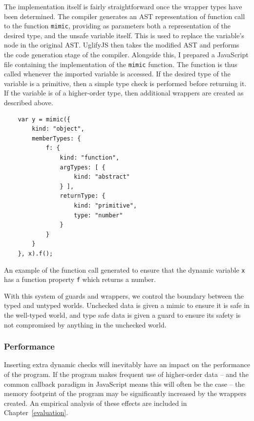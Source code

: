 \documentclass[12pt,a4paper,twoside,openright]{report}
\theoremstyle{definition}
\theoremstyle{dotless}
\begin{document}
The implementation itself is fairly straightforward once the wrapper types 
have been determined. The compiler generates an AST representation of function
call to the function \texttt{mimic}, providing as parameters both a representation
of the desired type, and the unsafe variable itself. This is used to replace the 
variable's node in the original AST. UglifyJS then takes the modified AST and 
performs the code generation stage of the compiler. Alongside this, I prepared
a JavaScript file containing the implementation of the \texttt{mimic} function. 
The function is thus called whenever the imported variable is accessed. If the
desired type of the variable is a primitive, then a simple type check is performed 
before returning it. If the variable is of a higher-order type, then additional
wrappers are created as described above.
\begin{program}
  \begin{verbatim}
	var y = mimic({
	    kind: "object",
	    memberTypes: {
	        f: {
	            kind: "function",
	            argTypes: [ {
	                kind: "abstract"
	            } ],
	            returnType: {
	                kind: "primitive",
	                type: "number"
	            }
	        }
	    }
	}, x).f();
  \end{verbatim}
  \caption{An example of the function call generated to ensure that the 
  dynamic variable \texttt{x} has a function property \texttt{f} which returns a number.}
	\label{lst:importPrim}
\end{program}

With this system of guards and wrappers, we control the boundary between the
typed and untyped worlds. Unchecked data is given a mimic to ensure it is safe
in the well-typed world, and type safe data is given a guard to ensure its
safety is not compromised by anything in the unchecked world.

\subsubsection*{Performance}

Inserting extra dynamic checks will inevitably have an impact on the
performance of the program. If the program makes frequent use of higher-order
data -- and the common callback paradigm in JavaScript means this will often be
the case -- the memory footprint of the program may be significantly increased
by the wrappers created. An empirical analysis of these effects are included in
Chapter~\ref{evaluation}.
\end{document}
